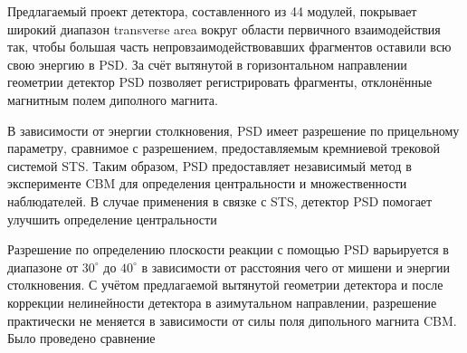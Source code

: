 
Предлагаемый проект детектора, составленного из 44 модулей, покрывает широкий диапазон transverse area \todo вокруг области первичного взаимодействия так, чтобы большая часть непровзаимодействовавших фрагментов оставили всю свою энергию в PSD. За счёт вытянутой в горизонтальном направлении геометрии детектор PSD позволяет регистрировать фрагменты, отклонённые магнитным полем диполного магнита.



В зависимости от энергии столкновения, PSD имеет разрешение по прицельному параметру, сравнимое с разрешением, предоставляемым кремниевой трековой системой STS. Таким образом, PSD предоставляет независимый метод в эксперименте CBM для определения центральности и множественности наблюдателей. В случае применения в связке с STS, детектор PSD помогает улучшить определение центральности 


Разрешение по определению плоскости реакции с помощью PSD варьируется в диапазоне от $30^\circ$ до $40^\circ$ в зависимости от расстояния \todo чего \todo от мишени и энергии столкновения. С учётом предлагаемой вытянутой геометрии детектора и после коррекции нелинейности детектора в азимутальном направлении, разрешение практически не меняется в зависимости от силы поля дипольного магнита CBM. Было проведено сравнение 

